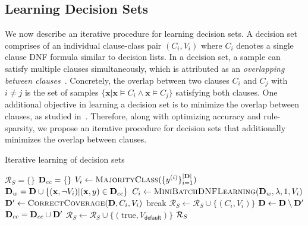 \subsection{Learning Decision Sets}
We now describe an iterative procedure for learning decision sets. A decision set comprises of an individual clause-class  pair $ (C_i, V_i) $ where $ C_i $ denotes a single clause DNF formula similar to decision lists. In a decision set, a sample can satisfy multiple clauses simultaneously, which is attributed as an \textit{overlapping between clauses}~\cite{lakkaraju2016interpretable}. Concretely, the overlap between two clauses $ C_i $ and $ C_j $ with $ i \ne j $ is the set of samples $ \{\mathbf{x} | \mathbf{x} \models C_i \wedge \mathbf{x} \models C_j\} $ satisfying both clauses. One additional objective in learning a decision set is to minimize the overlap between clauses, as studied in~\cite{lakkaraju2016interpretable}. 
Therefore, along with optimizing accuracy and rule-sparsity, we propose an iterative procedure for decision sets that additionally minimizes the overlap between clauses.

\begin{algorithm}
	\caption{Iterative learning of decision sets}
	\label{interpretability_imli_algo:iterative_decision_sets_learning}
	\begin{algorithmic}[1]
		\State $ \mathcal{R}_S=\{\} $
		\State $ \mathbf{D}_{cc} = \{\}$  
		\State $ V_i \leftarrow \textsc{MajorityClass}(\{y^{(i)}\}_{i=1}^{|\mathbf{D}|}) $
		\State $ \mathbf{D}_{w} = \mathbf{D}  \cup \{(\mathbf{x}, \neg V_i) | (\mathbf{x}, y) \in \mathbf{D}_{cc}\} $ 
		\State $ C_i \leftarrow \textsc{MiniBatchDNFLearning}( \mathbf{D}_w,\lambda, 1, V_i) $ 
		\State $ \mathbf{D}' \leftarrow \textsc{CorrectCoverage}(\mathbf{D}, C_i, V_i) $
		\State break
		\EndIf
		\State $ \mathcal{R}_S \leftarrow \mathcal{R}_S \cup \{(C_i, V_i)\} $
		\State $ \mathbf{D} \leftarrow \mathbf{D}  \setminus \mathbf{D}' $
		\State $ \mathbf{D}_{cc} = \mathbf{D}_{cc} \cup \mathbf{D}' $
		\EndFor
		\State $ \mathcal{R}_S \leftarrow \mathcal{R}_S  \cup \{(\text{true}, V_{\mathsf{default}} )\}$
		\State \Return $ {\mathcal{R}}_S $
		\EndProcedure
	\end{algorithmic}
\end{algorithm} 






